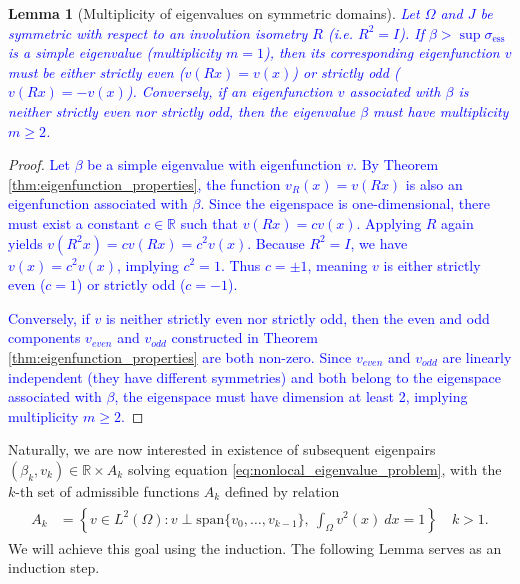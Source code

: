\documentclass[12pt, a4paper]{article}
\newcommand{\revision}[1]{\textcolor{blue}{#1}}
\theoremstyle{break}
\theoremstyle{break}
\theoremstyle{break}
\theoremstyle{break}
\theoremstyle{break}
\newtheorem{lem}{Lemma}[section]
\theoremstyle{break}
\theoremstyle{break}
\theoremstyle{break}
\theoremstyle{break}
\begin{document}
\begin{lem}[Multiplicity of eigenvalues on symmetric domains]
    \label{lem:eigenvalue_multiplicity}
    \revision{Let $\Omega$ and $J$ be symmetric with respect to an involution isometry $R$ (i.e. $R^2 = I$). If $\beta > \sup \sigma_{\mathrm{ess}}$ is a simple eigenvalue (multiplicity $m=1$), then its corresponding eigenfunction $v$ must be either strictly even ($v(Rx) = v(x)$) or strictly odd ($v(Rx) = -v(x)$). Conversely, if an eigenfunction $v$ associated with $\beta$ is neither strictly even nor strictly odd, then the eigenvalue $\beta$ must have multiplicity $m \geq 2$.}
\end{lem}
\begin{proof}
    \revision{Let $\beta$ be a simple eigenvalue with eigenfunction $v$. By Theorem \ref{thm:eigenfunction_properties}, the function $v_R(x) = v(Rx)$ is also an eigenfunction associated with $\beta$. Since the eigenspace is one-dimensional, there must exist a constant $c \in \mathbb{R}$ such that $v(Rx) = c v(x)$. Applying $R$ again yields $v(R^2x) = c v(Rx) = c^2 v(x)$. Because $R^2 = I$, we have $v(x) = c^2 v(x)$, implying $c^2 = 1$. Thus $c = \pm 1$, meaning $v$ is either strictly even ($c=1$) or strictly odd ($c=-1$).}
    
    \revision{Conversely, if $v$ is neither strictly even nor strictly odd, then the even and odd components $v_{even}$ and $v_{odd}$ constructed in Theorem \ref{thm:eigenfunction_properties} are both non-zero. Since $v_{even}$ and $v_{odd}$ are linearly independent (they have different symmetries) and both belong to the eigenspace associated with $\beta$, the eigenspace must have dimension at least 2, implying multiplicity $m \geq 2$.}
\end{proof}

Naturally, we are now interested in existence of subsequent eigenpairs $(\beta_k, v_k) \in \mathbb{R}\times A_k$ solving equation \eqref{eq:nonlocal_eigenvalue_problem}, with the $k$-th set of admissible functions $A_k$ defined by relation
\begin{align}
    \begin{split}
        A_k &= \left\{ v \in L^2(\Omega): v \perp \text{span}\{v_0, \ldots, v_{k-1}\}, \: \int_\Omega v^2(x) \: dx = 1 \right\} \quad k > 1.
    \end{split}
\end{align}
We will achieve this goal using the induction. The following Lemma serves as an induction step.
\end{document}
